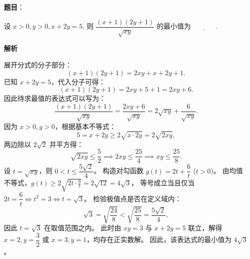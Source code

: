 \begin{answer}

\textbf{题目}：

设 $x > 0, y > 0, x + 2y = 5$, 则 $\dfrac{(x + 1)(2y + 1)}{\sqrt{xy}}$ 的最小值为 $\underline{\phantom{XXXX}}$.

\textbf{解析}

展开分式的分子部分：
\nopagebreak[4]
\[(x + 1)(2y + 1) = 2xy + x + 2y + 1.\]
已知 $x + 2y = 5$，代入分子可得：
\nopagebreak[4]
\[(x + 1)(2y + 1) = 2xy + 5 + 1 = 2xy + 6.\]
因此待求最值的表达式可以写为：
\nopagebreak[4]
\[\frac{(x + 1)(2y + 1)}{\sqrt{xy}} = \frac{2xy + 6}{\sqrt{xy}} = 2\sqrt{xy} + \frac{6}{\sqrt{xy}}.\]
因为 $x > 0, y > 0$，根据基本不等式：
\nopagebreak[4]
\[5 = x + 2y \geqslant 2\sqrt{x \cdot 2y} = 2\sqrt{2xy},\]
两边除以 $2\sqrt{2}$ 并平方得：
\nopagebreak[4]
\[\sqrt{2xy} \leqslant \frac{5}{2} \implies 2xy \leqslant \frac{25}{4} \implies xy \leqslant \frac{25}{8}.\]
设 $t = \sqrt{xy}$，则 $0 < t \leqslant \dfrac{5\sqrt{2}}{4}$。
构造对勾函数 $g(t) = 2t + \dfrac{6}{t}$ ($t > 0$)。
由均值不等式，$g(t) \geqslant 2\sqrt{2t \cdot \frac{6}{t}} = 2\sqrt{12} = 4\sqrt{3}$，
等号成立当且仅当 $2t = \dfrac{6}{t} \iff t^2 = 3 \iff t = \sqrt{3}$。
检验极值点是否在定义域内：
\nopagebreak[4]
\[\sqrt{3} = \sqrt{\frac{24}{8}} < \sqrt{\frac{25}{8}} = \frac{5\sqrt{2}}{4},\]
因此 $t = \sqrt{3}$ 在取值范围之内。
此时由 $xy = 3$ 与 $x + 2y = 5$ 联立，解得 $x = 2, y = \dfrac{3}{2}$ 或 $x = 3, y = 1$，均存在正实数解。
因此，该表达式的最小值为 $4\sqrt{3}$。


\end{answer}
